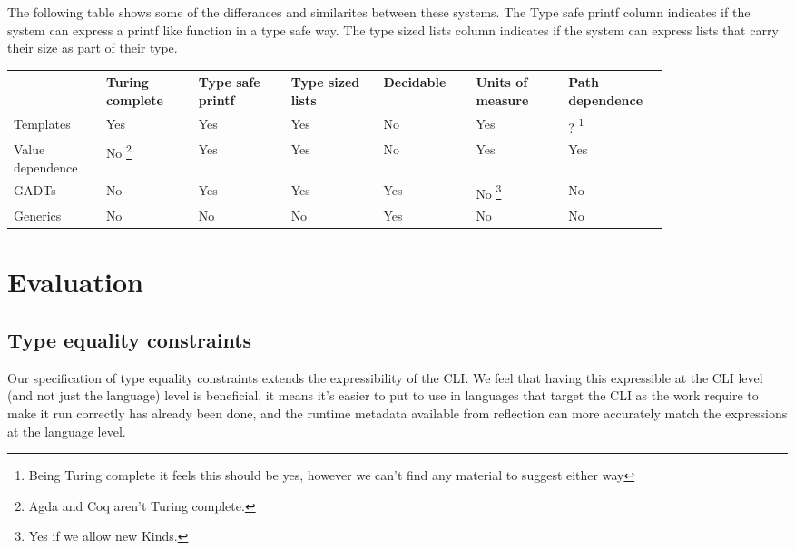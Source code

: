 \documentclass[english]{report}
\begin{document}
The following table shows some of the differances and similarites
between these systems. The Type safe printf column indicates if the
system can express a printf like function in a type safe way. The
type sized lists column indicates if the system can express lists
that carry their size as part of their type.

\begin{center}
\begin{longtable}{|>{\centering}p{0.12\linewidth}|>{\centering}p{0.12\linewidth}|>{\centering}p{0.12\linewidth}|>{\centering}p{0.12\linewidth}|>{\centering}p{0.12\linewidth}|>{\centering}p{0.12\linewidth}|>{\centering}p{0.12\linewidth}|}
\cline{2-7} 
\multicolumn{1}{>{\centering}p{0.12\linewidth}|}{} & Turing complete & Type safe printf & Type sized lists & Decidable & Units of measure & Path dependence\tabularnewline
\hline 
Templates & Yes & Yes & Yes & No & Yes & ?%
\footnote{Being Turing complete it feels this should be yes, however we can't
find any material to suggest either way%
}\tabularnewline
\hline 
Value dependence & No%
\footnote{Agda and Coq aren't Turing complete.%
} & Yes & Yes & No & Yes & Yes\tabularnewline
\hline 
GADTs & No & Yes & Yes & Yes & No%
\footnote{Yes if we allow new Kinds\cite{gadtsext}.%
} & No\tabularnewline
\hline 
Generics & No & No & No & Yes & No & No\tabularnewline
\hline 
\end{longtable}
\par\end{center}





\chapter{Evaluation}

\section{Type equality constraints}

Our specification of type equality constraints extends the expressibility of the CLI. 
We feel that having this expressible at the CLI level (and not just the language) level
is beneficial, it means it's easier to put to use in languages that target the CLI as 
the work require to make it run correctly has already been done, and the runtime metadata 
available from reflection can more accurately match the expressions at the language level.
\end{document}
